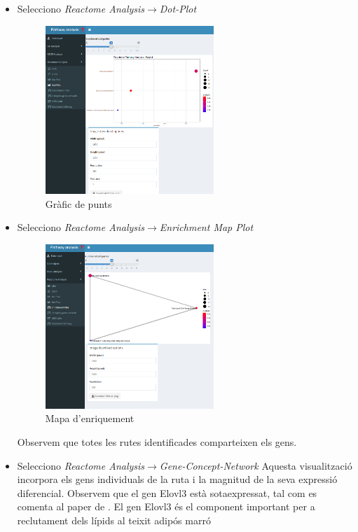 \begin{enumerate}
\begin{itemize}
\item Selecciono \textit{Reactome Analysis}$\rightarrow$\textit{\gls{Dot-Plot}}

\begin{figure}[H]
\centering
\includegraphics[width=0.6\textwidth]{figures/Estudi1_Fig5_ORA_Dot_RA.png} 
\caption{Gràfic de punts}
\end{figure}

\item Selecciono \textit{Reactome Analysis}$\rightarrow$\textit{\gls{Enrichment Map} Plot}

\begin{figure}[H]
\centering
\includegraphics[width=0.6\textwidth]{figures/Estudi1_Fig6_ORA_EP_RA.png} 
\caption{Mapa d'enriquement}
\end{figure}

Observem que totes les rutes identificades comparteixen els gens.

\item Selecciono \textit{Reactome Analysis}$\rightarrow$\textit{\gls{Gene-Concept-Network}}
Aquesta visualització incorpora els gens individuals de la ruta i la magnitud de la seva expressió diferencial. Observem que el gen Elovl3 està sotaexpressat, tal com es comenta al paper de \cite{li2017zbtb7b}. El gen Elovl3 és el component important per a reclutament dels lípids al teixit adipós marró \cite{westerberg2006elovl3}


\end{itemize}
\end{enumerate}
